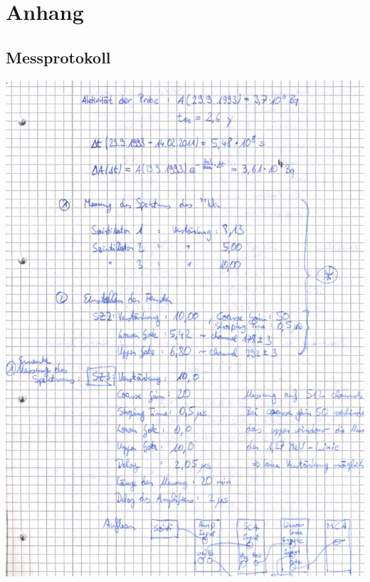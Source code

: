 \section{Anhang}
\subsection{Messprotokoll}
\includegraphics[scale=0.55]{Messprotokoll/0001.jpeg}
\clearpage
